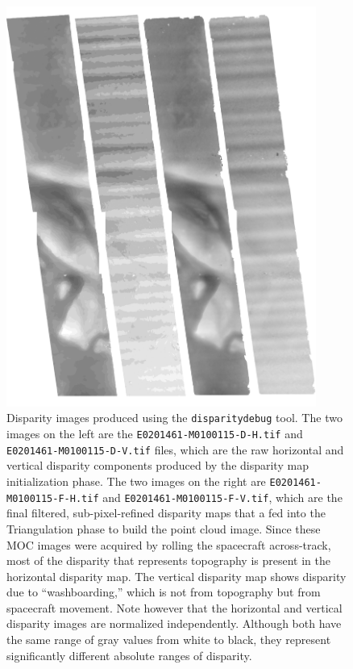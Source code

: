 \begin{figure}[t!]
\begin{minipage}{4in}
\includegraphics[width=4in]{images/p19-disparity.png}
\end{minipage}
\hfill
\begin{minipage}{2.7in}
\caption[P19 disparity images]{
    \label{p19-disparity}
	Disparity images produced using the \texttt{disparitydebug}
        tool.  The two images on the left are the
        \texttt{E0201461-M0100115-D-H.tif} and
        \texttt{E0201461-M0100115-D-V.tif} files, which are the raw
        horizontal and vertical disparity components produced by the
        disparity map initialization phase.  The two images on the
        right are \texttt{E0201461-M0100115-F-H.tif} and
        \texttt{E0201461-M0100115-F-V.tif}, which are the final
        filtered, sub-pixel-refined disparity maps that a fed into the
        Triangulation phase to build the point cloud image.  Since
        these MOC images were acquired by rolling the spacecraft
        across-track, most of the disparity that represents topography
        is present in the horizontal disparity map.  The vertical
        disparity map shows disparity due to ``washboarding,'' which
        is not from topography but from spacecraft movement. Note
        however that the horizontal and vertical disparity images are
        normalized independently.  Although both have the same range
        of gray values from white to black, they represent
        significantly different absolute ranges of disparity.}
\end{minipage}
\end{figure}

